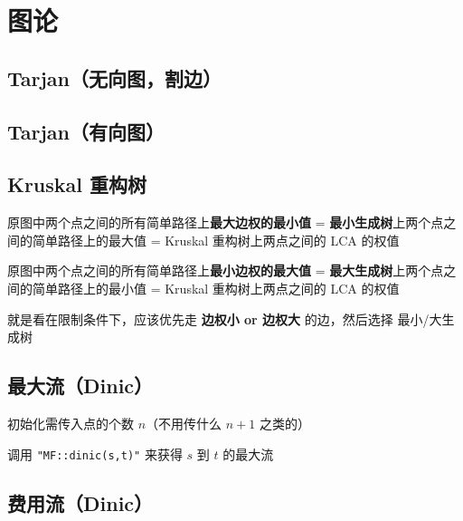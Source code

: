 \documentclass[12pt]{article}
\begin{document}
\newpage

{\centering\section{图论}}

\subsection{Tarjan（无向图，割边）}



\newpage

\subsection{Tarjan（有向图）}



\newpage

\subsection{Kruskal 重构树}

原图中两个点之间的所有简单路径上\textbf{最大边权的最小值} = \textbf{最小生成树}上两个点之间的简单路径上的最大值 = Kruskal 重构树上两点之间的 LCA 的权值

原图中两个点之间的所有简单路径上\textbf{最小边权的最大值} = \textbf{最大生成树}上两个点之间的简单路径上的最小值 = Kruskal 重构树上两点之间的 LCA 的权值

就是看在限制条件下，应该优先走 \textbf{边权小 or 边权大} 的边，然后选择 最小/大生成树



\newpage

\subsection{最大流（Dinic）}

初始化需传入点的个数 $n$（不用传什么 $n+1$ 之类的）

调用 \texttt{"MF::dinic(s,t)"} 来获得 $s$ 到 $t$ 的最大流



\newpage

\subsection{费用流（Dinic）}
\end{document}
